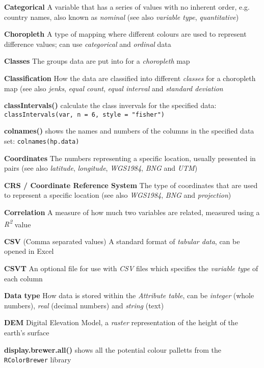\documentclass[a4paper,10pt]{article}
\begin{document}
\begin{multicols}{2}
\textbf{Categorical} A variable that has a series of values with no inherent order, e.g. country names, also known as \textit{nominal} (see also \textit{variable type}, \textit{quantitative}) 

\textbf{Choropleth} A type of mapping where different colours are used to represent difference values; can use \textit{categorical} and \textit{ordinal} data

\textbf{Classes} The groups data are put into for a \textit{choropleth} map

\textbf{Classification} How the data are classified into different \textit{classes} for a choropleth map (see also \textit{jenks}, \textit{equal count}, \textit{equal interval} and \textit{standard deviation}

\textbf{classIntervals()} calculate the class invervals for the specified data: \texttt{classIntervals(var, n = 6, style = "fisher")}

\textbf{colnames()} shows the names and numbers of the columns in the specified data set: \texttt{colnames(hp.data)}

\textbf{Coordinates} The numbers representing a specific location, usually presented in pairs (see also \textit{latitude}, \textit{longitude}, \textit{WGS1984}, \textit{BNG} and \textit{UTM})

\textbf{CRS / Coordinate Reference System} The type of coordinates that are used to represent a specific location (see also \textit{WGS1984}, \textit{BNG} and \textit{projection})

\textbf{Correlation} A measure of how much two variables are related, measured using a \textit{R\textsuperscript{2}} value 

\textbf{CSV} (Comma separated values) A standard format of \textit{tabular data}, can be opened in Excel  

\textbf{CSVT} An optional file for use with \textit{CSV} files which specifies the \textit{variable type} of each column %

\textbf{Data type} How data is stored within the \textit{Attribute table}, can be \textit{integer} (whole numbers), \textit{real} (decimal numbers) and \textit{string} (text) 

\textbf{DEM} Digital Elevation Model, a \textit{raster} representation of the height of the earth's surface

\textbf{display.brewer.all()} shows all the potential colour palletts from the \texttt{RColorBrewer} library


\end{multicols}
\end{document}
